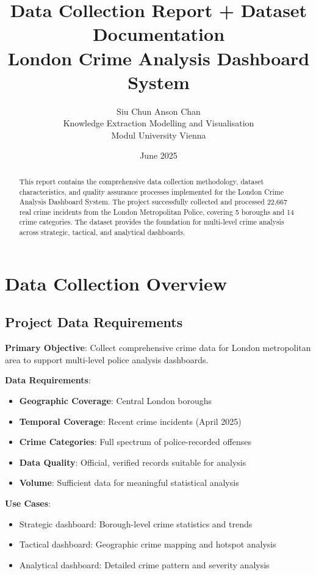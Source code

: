 \documentclass[12pt,a4paper]{article}
\title{\textbf{Data Collection Report + Dataset Documentation\\London Crime Analysis Dashboard System}}
\author{Siu Chun Anson Chan \\ Knowledge Extraction Modelling and Visualisation \\ Modul University Vienna}
\date{June 2025}
\begin{document}
\maketitle
\thispagestyle{fancy}

\begin{abstract}
This report contains the comprehensive data collection methodology, dataset characteristics, and quality assurance processes implemented 
for the London Crime Analysis Dashboard System. The project successfully collected and processed 22,667 real crime incidents from the 
London Metropolitan Police, covering 5 boroughs and 14 crime categories. The dataset provides the foundation for multi-level crime analysis 
across strategic, tactical, and analytical dashboards.
\end{abstract}

\tableofcontents
\newpage

\section{Data Collection Overview}

\subsection{Project Data Requirements}

\textbf{Primary Objective}: Collect comprehensive crime data for London metropolitan area to support multi-level police analysis dashboards.

\textbf{Data Requirements}:
\begin{itemize}
    \item \textbf{Geographic Coverage}: Central London boroughs
    \item \textbf{Temporal Coverage}: Recent crime incidents (April 2025)
    \item \textbf{Crime Categories}: Full spectrum of police-recorded offenses
    \item \textbf{Data Quality}: Official, verified records suitable for analysis
    \item \textbf{Volume}: Sufficient data for meaningful statistical analysis
\end{itemize}

\textbf{Use Cases}:
\begin{itemize}
    \item Strategic dashboard: Borough-level crime statistics and trends
    \item Tactical dashboard: Geographic crime mapping and hotspot analysis
    \item Analytical dashboard: Detailed crime pattern and severity analysis
\end{itemize}
\end{document}

